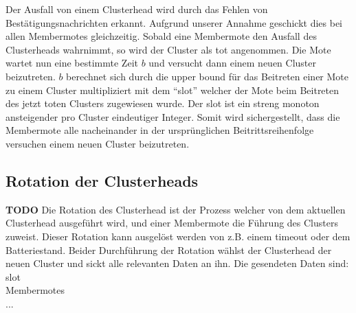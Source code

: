 Der Ausfall von einem Clusterhead wird durch das Fehlen von Best\"atigungsnachrichten erkannt.
Aufgrund unserer Annahme geschickt dies bei allen Membermotes gleichzeitig.
Sobald eine Membermote den Ausfall des Clusterheads wahrnimmt, so wird der Cluster als tot angenommen.
Die Mote wartet nun eine bestimmte Zeit $b$ und versucht dann einem neuen Cluster beizutreten.
$b$ berechnet sich durch die upper bound f\"ur das Beitreten einer Mote zu einem Cluster multipliziert mit dem ``slot'' welcher der Mote beim Beitreten des jetzt toten Clusters zugewiesen wurde.
Der slot ist ein streng monoton ansteigender pro Cluster eindeutiger Integer.
Somit wird sichergestellt, dass die Membermote alle nacheinander in der urspr\"unglichen Beitrittsreihenfolge versuchen einem neuen Cluster beizutreten.

\subsection{Rotation der Clusterheads} \textbf{TODO}
Die Rotation des Clusterhead ist der Prozess welcher von dem aktuellen Clusterhead ausgef\"uhrt wird, und einer Membermote die F\"uhrung des Clusters zuweist.
Dieser Rotation kann ausgel\"ost werden von z.B. einem timeout oder dem Batteriestand.
Beider Durchf\"uhrung der Rotation w\"ahlst der Clusterhead der neuen Cluster und sickt alle relevanten Daten an ihn.
Die gesendeten Daten sind:
slot\\
Membermotes\\
...\\
